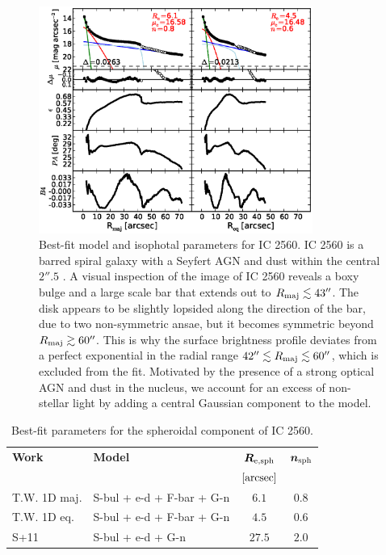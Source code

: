 \documentclass[preprint2]{emulateapj}
\newcommand{\fitfigurewidth}{0.8\textwidth}
\begin{document}
  \begin{figure}[h]
  \begin{center}
  \includegraphics[width=\fitfigurewidth]{images/ic2560_1Dfit.eps}
  \caption{Best-fit model and isophotal parameters for IC 2560. IC 2560 is a barred spiral galaxy with a Seyfert AGN \citep{veroncettyveron2006}
  and dust within the central $2''.5$ \citep{martini2003}.
  A visual inspection of the image of IC 2560 reveals a boxy bulge and
  a large scale bar that extends out to $R_{\rm maj} \lesssim 43''$.
  The disk appears to be slightly lopsided along the direction of the bar,
  due to two non-symmetric ansae, but it becomes symmetric beyond $R_{\rm maj} \gtrsim 60''$. 
  This is why the surface brightness profile deviates from a perfect exponential
  in the radial range $42'' \lesssim R_{\rm maj} \lesssim 60''$, which is excluded from the fit.
  Motivated by the presence of a strong optical AGN and dust in the nucleus, 
  we account for an excess of non-stellar light by adding a central Gaussian component to the model.}
  \end{center}
  \end{figure}

  \begin{table}[h]
  \small
  \caption{Best-fit parameters for the spheroidal component of IC 2560.}
  \begin{center}
  \begin{tabular}{llcc}
  \hline
  {\bf Work} & {\bf Model}   & $\bm R_{\rm e,sph}$    & $\bm n_{\rm sph}$ \\
    &  &  $[\rm arcsec]$ & \\
  \hline
  T.W. 1D maj. & S-bul + e-d + F-bar + G-n & $6.1$  &  $0.8$ \\
  T.W. 1D eq.  & S-bul + e-d + F-bar + G-n & $4.5$  &  $0.6$ \\
  \hline
  S+11         & S-bul + e-d + G-n & $27.5$  &  $2.0$ \\
  \hline
  \end{tabular}
  \end{center}
  \label{tab:ic2560}
  \end{table}
\end{document}
